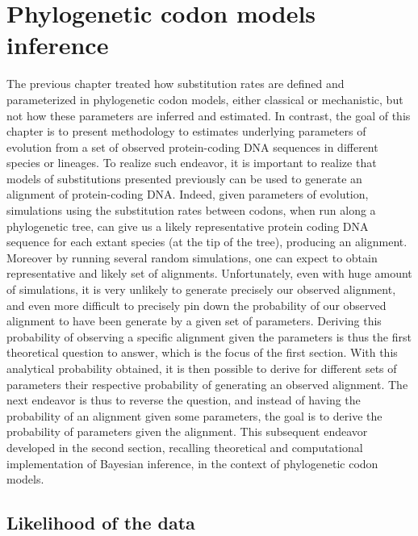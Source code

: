 \chapter{Phylogenetic {codon} models inference}
{\hypersetup{linkcolor=GREYDARK}\minitoc}
\label{chap:intro-inference}

The previous chapter treated how \gls{substitution} rates are defined and parameterized in phylogenetic codon models, either classical or mechanistic, but not how these parameters are inferred and estimated.
In contrast, the goal of this chapter is to present methodology to estimates underlying parameters of evolution from a set of observed protein-coding \acrshort{DNA} sequences in different species or lineages.
To realize such endeavor, it is important to realize that models of \glspl{substitution} presented previously can be used to generate an alignment of  protein-coding \acrshort{DNA}.
Indeed, given parameters of evolution, simulations using the \gls{substitution} rates between \glspl{codon}, when run along a phylogenetic tree, can give us a likely representative protein coding \acrshort{DNA} sequence for each extant species (at the tip of the tree), producing an alignment. 
Moreover by running several random simulations, one can expect to obtain representative and likely set of alignments.
Unfortunately, even with huge amount of simulations, it is very unlikely to generate precisely our observed alignment, and even more difficult to precisely pin down the probability of our observed alignment to have been generate by a given set of parameters.
Deriving this probability of observing a specific alignment given the parameters is thus the first theoretical question to answer, which is the focus of the first section.
With this analytical probability obtained, it is then possible to derive for different sets of parameters their respective probability of generating an observed alignment.
The next endeavor is thus to reverse the question, and instead of having the probability of an alignment given some parameters, the goal is to derive the probability of parameters given the alignment.
This subsequent endeavor developed in the second section, recalling theoretical and computational implementation of Bayesian inference, in the context of phylogenetic \gls{codon} models.

\section{Likelihood of the data}
\label{sec-intro:likelihood}


